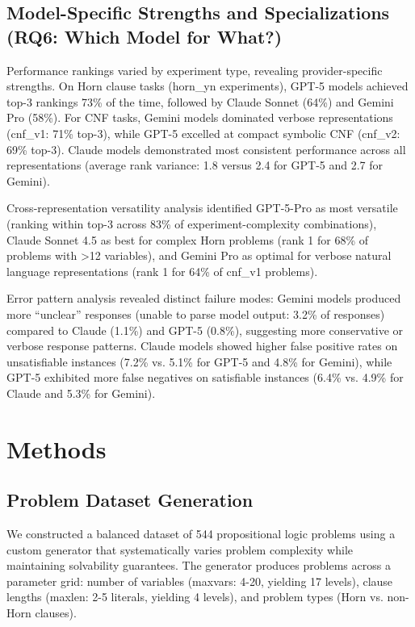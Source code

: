 \documentclass[pdflatex,sn-mathphys-num]{sn-jnl}%
\theoremstyle{thmstyleone}%
\theoremstyle{thmstyletwo}%
\theoremstyle{thmstylethree}%
\begin{document}
\subsection{Model-Specific Strengths and Specializations (RQ6: Which Model for What?)}\label{subsec:models}

Performance rankings varied by experiment type, revealing provider-specific strengths. On Horn clause tasks (horn\_yn experiments), GPT-5 models achieved top-3 rankings 73\% of the time, followed by Claude Sonnet (64\%) and Gemini Pro (58\%). For CNF tasks, Gemini models dominated verbose representations (cnf\_v1: 71\% top-3), while GPT-5 excelled at compact symbolic CNF (cnf\_v2: 69\% top-3). Claude models demonstrated most consistent performance across all representations (average rank variance: 1.8 versus 2.4 for GPT-5 and 2.7 for Gemini).

Cross-representation versatility analysis identified GPT-5-Pro as most versatile (ranking within top-3 across 83\% of experiment-complexity combinations), Claude Sonnet 4.5 as best for complex Horn problems (rank 1 for 68\% of problems with >12 variables), and Gemini Pro as optimal for verbose natural language representations (rank 1 for 64\% of cnf\_v1 problems).

Error pattern analysis revealed distinct failure modes: Gemini models produced more ``unclear'' responses (unable to parse model output: 3.2\% of responses) compared to Claude (1.1\%) and GPT-5 (0.8\%), suggesting more conservative or verbose response patterns. Claude models showed higher false positive rates on unsatisfiable instances (7.2\% vs. 5.1\% for GPT-5 and 4.8\% for Gemini), while GPT-5 exhibited more false negatives on satisfiable instances (6.4\% vs. 4.9\% for Claude and 5.3\% for Gemini).

\section{Methods}\label{sec:methods}

\subsection{Problem Dataset Generation}\label{subsec:dataset}

We constructed a balanced dataset of 544 propositional logic problems using a custom generator that systematically varies problem complexity while maintaining solvability guarantees. The generator produces problems across a parameter grid: number of variables (maxvars: 4-20, yielding 17 levels), clause lengths (maxlen: 2-5 literals, yielding 4 levels), and problem types (Horn vs. non-Horn clauses).
\end{document}
